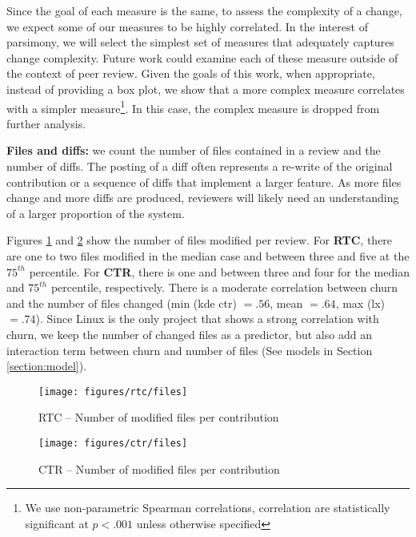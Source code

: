 %
Since the goal of each measure is the same, to assess the complexity of a
change, we expect some of our measures to be highly correlated. 
In the interest of parsimony, we will select the simplest set of measures that
adequately captures change complexity. Future work could examine each of these
measure outside of the context of peer review. Given the goals of this work,
when appropriate, instead of providing a box plot, we show that a more complex
measure correlates with a simpler measure\footnote{We use non-parametric
Spearman correlations, correlation are statistically significant at $ p < .001$
unless otherwise specified}. In this case, the complex measure is dropped from
further analysis. 

{\bf Files and diffs:} we count the number of files contained in a review and
the number of diffs. The posting of a diff often represents a re-write of the
original contribution or a sequence of diffs that implement a larger feature.
As more files change and more diffs are produced, reviewers will likely need an
understanding of a larger proportion of the system.

Figures \ref{fig:rtc_files} and \ref{fig:ctr_files} show the number of files
modified per review. For {\bf RTC}, there are one to two files modified in the
median case and between three and five at the $75^{th}$ percentile.  For {\bf
CTR}, there is one and between three and four for the median and $75^{th}$
percentile, respectively. There is a moderate correlation between churn and the
number of files changed (min (kde ctr) $= .56$, mean $= .64$, max (lx)
$=.74$). Since Linux is the only project that shows a strong correlation with
churn, we keep the number of changed files as a predictor, but also add an
interaction term between churn and number of files (See models in Section
\ref{section:model}).

\begin{figure}
\centering
\texttt{[image: figures/rtc/files]} 
\caption{RTC -- Number of modified files per contribution}
\label{fig:rtc_files}
\end{figure}
\begin{figure}
\centering
\texttt{[image: figures/ctr/files]}
\caption{CTR -- Number of modified files per contribution}
\label{fig:ctr_files}
\end{figure}

